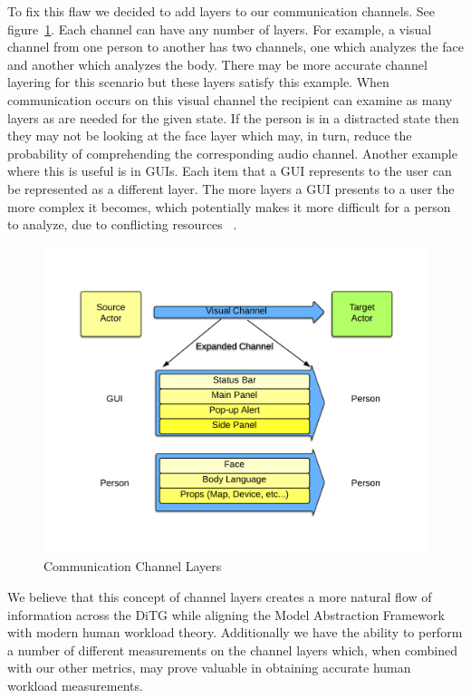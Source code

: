 To fix this flaw we decided to add layers to our communication channels. See figure~\ref{fig:layers}.  Each channel can have any number of layers.  For example, a visual channel from one person to another has two channels, one which analyzes the face and another which analyzes the body.  There may be more accurate channel layering for this scenario but these layers satisfy this example.  When communication occurs on this visual channel the recipient can examine as many layers as are needed for the given state.  If the person is in a distracted state then they may not be looking at the face layer which may, in turn, reduce the probability of comprehending the corresponding audio channel.   Another example where this is useful is in GUIs.  Each item that a GUI represents to the user can be represented as a different layer.  The more layers a GUI presents to a user the more complex it becomes, which potentially makes it more difficult for a person to analyze, due to conflicting resources ~\cite{salvucci2008threaded}.

\begin{figure}[h]
\begin{center}
\includegraphics[width=6in]{layers.png}
\caption{Communication Channel Layers}
\label{fig:layers}
\end{center}
\end{figure}

We believe that this concept of channel layers creates a more natural flow of information across the DiTG while aligning the Model Abstraction Framework with modern human workload theory.  Additionally we have the ability to perform a number of different measurements on the channel layers which, when combined with our other metrics, may prove valuable in obtaining accurate human workload measurements.

